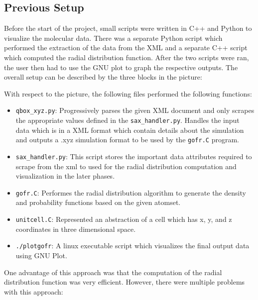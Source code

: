 
\subsection*{Previous Setup}

Before the start of the project, small scripts were written in C++ and Python to visualize the molecular data. There was a separate Python script which performed the extraction of the data from the XML and a separate C++ script which computed the radial distribution function. After the two scripts were ran, the user then had to use the GNU plot to graph the respective outputs. The overall setup can be described by the three blocks in the picture:





With respect to the picture, the following files performed the following functions: 

\begin{itemize}
        
    \item \verb|qbox_xyz.py|: Progressively parses the given XML document and only scrapes the appropriate values defined in the \verb|sax_handler.py|. Handles the input data which is in a XML format which contain details about the simulation and outputs a .xyz simulation format to be used by the \verb|gofr.C| program.
    
    \item \verb|sax_handler.py|: This script stores the important data attributes required to scrape from the xml to used for the radial distribution computation and visualization in the later phases.

    \item \verb|gofr.C|: Performes the radial distribution algorithm to generate the density and probability functions based on the given atomset.
    
    \item \verb|unitcell.C|: Represented an abstraction of a cell which has x, y, and z coordinates in three dimensional space.
    
    \item \verb|./plotgofr|: A linux executable script which visualizes the final output data using GNU Plot.
    
\end{itemize}





One advantage of this approach was that the computation of the radial distribution function was very efficient. However, there were multiple problems with this approach:

